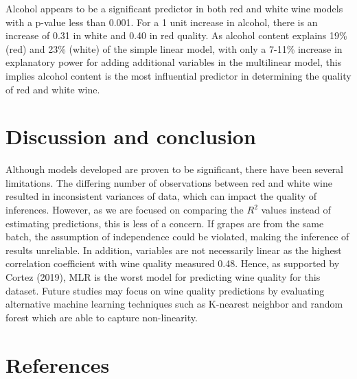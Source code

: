 \documentclass[letterpaper,11pt,twocolumn,twoside,]{pinp}
\begin{document}
Alcohol appears to be a significant predictor in both red and white wine
models with a p-value less than 0.001. For a 1 unit increase in alcohol,
there is an increase of 0.31 in white and 0.40 in red quality. As
alcohol content explains 19\% (red) and 23\% (white) of the simple
linear model, with only a 7-11\% increase in explanatory power for
adding additional variables in the multilinear model, this implies
alcohol content is the most influential predictor in determining the
quality of red and white wine.

\hypertarget{discussion-and-conclusion}{%
\section{Discussion and conclusion}\label{discussion-and-conclusion}}

Although models developed are proven to be significant, there have been
several limitations. The differing number of observations between red
and white wine resulted in inconsistent variances of data, which can
impact the quality of inferences. However, as we are focused on
comparing the \(R^2\) values instead of estimating predictions, this is
less of a concern. If grapes are from the same batch, the assumption of
independence could be violated, making the inference of results
unreliable. In addition, variables are not necessarily linear as the
highest correlation coefficient with wine quality measured 0.48. Hence,
as supported by Cortez (2019), MLR is the worst model for predicting
wine quality for this dataset. Future studies may focus on wine quality
predictions by evaluating alternative machine learning techniques such
as K-nearest neighbor and random forest which are able to capture
non-linearity.

\newpage

\hypertarget{references}{%
\section{References}\label{references}}
\end{document}
